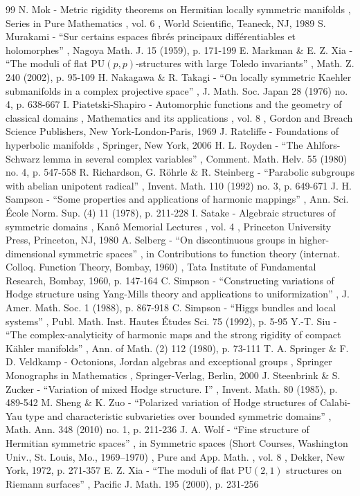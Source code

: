 \documentclass[10pt]{amsart}
\theoremstyle{plain}
\theoremstyle{definition}
\begin{document}
\begin{thebibliography}{99}
 N. Mok - Metric rigidity theorems on Hermitian locally symmetric manifolds , Series in Pure Mathematics , vol. 6 , World Scientific, Teaneck, NJ, 1989
 S. Murakami - “Sur certains espaces fibrés principaux différentiables et holomorphes” , Nagoya Math. J. 15 (1959), p. 171-199
 E. Markman \& E. Z. Xia - “The moduli of flat $\mathrm{PU}(p,p)$-structures with large Toledo invariants” , Math. Z. 240 (2002), p. 95-109
 H. Nakagawa \& R. Takagi - “On locally symmetric Kaehler submanifolds in a complex projective space” , J. Math. Soc. Japan 28 (1976) no. 4, p. 638-667
 I. Piatetski-Shapiro - Automorphic functions and the geometry of classical domains , Mathematics and its applications , vol. 8 , Gordon and Breach Science Publishers, New York-London-Paris, 1969
 J. Ratcliffe - Foundations of hyperbolic manifolds , Springer, New York, 2006
 H. L. Royden - “The Ahlfors-Schwarz lemma in several complex variables” , Comment. Math. Helv. 55 (1980) no. 4, p. 547-558
 R. Richardson, G. Röhrle \& R. Steinberg - “Parabolic subgroups with abelian unipotent radical” , Invent. Math. 110 (1992) no. 3, p. 649-671
 J. H. Sampson - “Some properties and applications of harmonic mappings” , Ann. Sci. École Norm. Sup. (4) 11 (1978), p. 211-228
 I. Satake - Algebraic structures of symmetric domains , Kanô Memorial Lectures , vol. 4 , Princeton University Press, Princeton, NJ, 1980
 A. Selberg - “On discontinuous groups in higher-dimensional symmetric spaces” , in Contributions to function theory (internat. Colloq. Function Theory, Bombay, 1960) , Tata Institute of Fundamental Research, Bombay, 1960, p. 147-164
 C. Simpson - “Constructing variations of Hodge structure using Yang-Mills theory and applications to uniformization” , J. Amer. Math. Soc. 1 (1988), p. 867-918
 C. Simpson - “Higgs bundles and local systems” , Publ. Math. Inst. Hautes Études Sci. 75 (1992), p. 5-95
 Y.-T. Siu - “The complex-analyticity of harmonic maps and the strong rigidity of compact Kähler manifolds” , Ann. of Math. (2) 112 (1980), p. 73-111
 T. A. Springer \& F. D. Veldkamp - Octonions, Jordan algebras and exceptional groups , Springer Monographs in Mathematics , Springer-Verlag, Berlin, 2000
 J. Steenbrink \& S. Zucker - “Variation of mixed Hodge structure. I” , Invent. Math. 80 (1985), p. 489-542
 M. Sheng \& K. Zuo - “Polarized variation of Hodge structures of Calabi-Yau type and characteristic subvarieties over bounded symmetric domains” , Math. Ann. 348 (2010) no. 1, p. 211-236
 J. A. Wolf - “Fine structure of Hermitian symmetric spaces” , in Symmetric spaces (Short Courses, Washington Univ., St. Louis, Mo., 1969–1970) , Pure and App. Math. , vol. 8 , Dekker, New York, 1972, p. 271-357
 E. Z. Xia - “The moduli of flat $\mathrm{PU}(2,1)$ structures on Riemann surfaces” , Pacific J. Math. 195 (2000), p. 231-256
\end{thebibliography}
\end{document}
